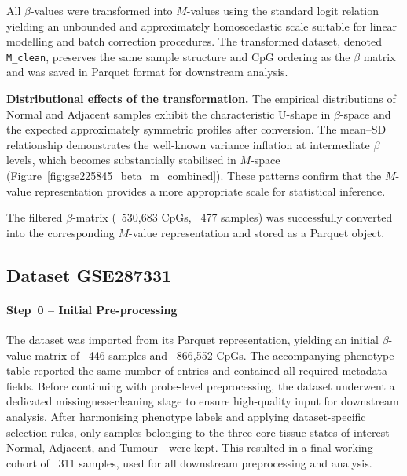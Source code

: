 \documentclass[10pt]{extarticle}
\newcommand{\good}[1]{\textcolor{teal!70!black}{\ding{51}~#1}}
\begin{document}
All $\beta$-values were transformed into $M$-values using the standard logit relation
yielding an unbounded and approximately homoscedastic scale suitable for linear modelling
and batch correction procedures.  
The transformed dataset, denoted \texttt{M\_clean}, preserves the same sample structure and CpG ordering as the $\beta$ matrix and was saved in Parquet format for downstream analysis.

\textbf{Distributional effects of the transformation.}
The empirical distributions of Normal and Adjacent samples exhibit the characteristic U-shape in $\beta$-space and the expected approximately symmetric profiles after conversion.  
The mean–SD relationship demonstrates the well-known variance inflation at intermediate $\beta$ levels, which becomes substantially stabilised in $M$-space
(Figure~\ref{fig:gse225845_beta_m_combined}).  
These patterns confirm that the $M$-value representation provides a more appropriate scale for statistical inference.

The filtered $\beta$-matrix (\good{530{,}683 CpGs}, \good{477 samples}) was successfully converted into
the corresponding $M$-value representation and stored as a Parquet object.  


\subsection{Dataset GSE287331}
\label{subsec:gse287331_preproc}

\paragraph{Step~0 -- Initial Pre-processing}
\label{par:gse287331_step0}

The dataset was imported from its Parquet representation, yielding an initial
$\beta$-value matrix of \good{446 samples} and \good{866{,}552 CpGs}.
The accompanying phenotype table reported the same number of entries and contained
all required metadata fields.  
Before continuing with probe-level preprocessing, the dataset underwent a dedicated
missingness-cleaning stage to ensure high-quality input for downstream analysis.
After harmonising phenotype labels and applying dataset-specific selection rules, only samples belonging to the three core tissue states of interest—Normal, Adjacent, and Tumour—were kept.
This resulted in a final working cohort of \good{311 samples}, used for all downstream preprocessing and analysis.
\end{document}
